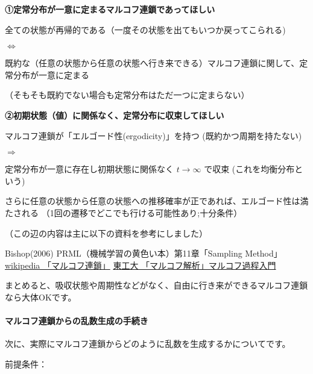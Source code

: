 \documentclass[
]{article}
\begin{document}
\textbf{①定常分布が一意に定まるマルコフ連鎖であってほしい}

全ての状態が再帰的である（一度その状態を出てもいつか戻ってこられる)

\(\iff\)

既約な（任意の状態から任意の状態へ行き来できる）マルコフ連鎖に関して、定常分布が一意に定まる

（そもそも既約でない場合も定常分布はただ一つに定まらない）

\textbf{②初期状態（値）に関係なく、定常分布に収束してほしい}

マルコフ連鎖が「エルゴード性(ergodicity)」を持つ
(既約かつ周期を持たない)

\(\Rightarrow\)

定常分布が一意に存在し初期状態に関係なく \(t \rightarrow \infty\) で収束
(これを均衡分布という)

さらに任意の状態から任意の状態への推移確率が正であれば、エルゴード性は満たされる
（1回の遷移でどこでも行ける可能性あり;十分条件）

（この辺の内容は主に以下の資料を参考にしました）

Bishop(2006) PRML（機械学習の黄色い本）第11章「Sampling Method」
\href{https://ja.wikipedia.org/wiki/\%E3\%83\%9E\%E3\%83\%AB\%E3\%82\%B3\%E3\%83\%95\%E9\%80\%A3\%E9\%8E\%96}{wikipedia
「マルコフ連鎖」}
\href{https://www.google.com/url?sa=t\&rct=j\&q=\&esrc=s\&source=web\&cd=\&ved=2ahUKEwjP4u-ErerwAhUBa94KHRyYAb4QFjAAegQIBBAD\&url=http\%3A\%2F\%2Fwww.ocw.titech.ac.jp\%2Findex.php\%3Fmodule\%3DGeneral\%26action\%3DDownLoad\%26file\%3D201602394-2401-0-1.pdf\%26type\%3Dcal\%26JWC\%3D201602394\&usg=AOvVaw2Irv_Guj_ICJi9pAJfVfnj}{東工大
「マルコフ解析」マルコフ過程入門}

まとめると、吸収状態や周期性などがなく、自由に行き来ができるマルコフ連鎖なら大体OKです。

\hypertarget{ux30deux30ebux30b3ux30d5ux9023ux9396ux304bux3089ux306eux4e71ux6570ux751fux6210ux306eux624bux7d9aux304d}{%
\paragraph{\texorpdfstring{\textbf{マルコフ連鎖からの乱数生成の手続き}}{マルコフ連鎖からの乱数生成の手続き}}\label{ux30deux30ebux30b3ux30d5ux9023ux9396ux304bux3089ux306eux4e71ux6570ux751fux6210ux306eux624bux7d9aux304d}}

次に、実際にマルコフ連鎖からどのように乱数を生成するかについてです。

前提条件：
\end{document}
